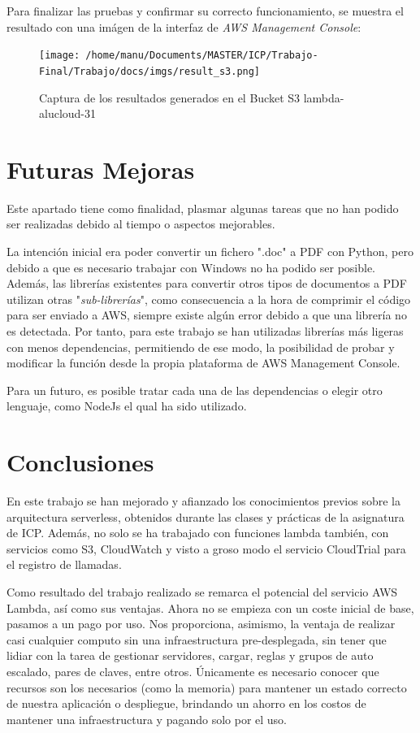 \documentclass[
]{article}
\begin{document}
Para finalizar las pruebas y confirmar su correcto funcionamiento, se
muestra el resultado con una imágen de la interfaz de \textit{AWS Management
Console}:

\begin{figure}[H]
\centering
\texttt{[image: /home/manu/Documents/MASTER/ICP/Trabajo-Final/Trabajo/docs/imgs/result\_s3.png]}
\caption{Captura de los resultados generados en el Bucket S3 lambda-alucloud-31}
\end{figure}
\newpage
\hypertarget{header-n206}{%
\section{Futuras Mejoras}\label{header-n206}}

Este apartado tiene como finalidad, plasmar algunas tareas que no han
podido ser realizadas debido al tiempo o aspectos mejorables.

La intención inicial era poder convertir un fichero ".doc" a PDF con
Python, pero debido a que es necesario trabajar con Windows no ha podido
ser posible. Además, las librerías existentes para convertir otros tipos
de documentos a PDF utilizan otras "\emph{sub-librerías}", como
consecuencia a la hora de comprimir el código para ser enviado a AWS,
siempre existe algún error debido a que una librería no es detectada.
Por tanto, para este trabajo se han utilizadas librerías más ligeras
con menos dependencias, permitiendo de ese modo, la posibilidad de
probar y modificar la función desde la propia plataforma de AWS
Management Console.

Para un futuro, es posible tratar cada una de las dependencias o elegir
otro lenguaje, como NodeJs el qual ha sido utilizado.

\hypertarget{header-n210}{%
\section{Conclusiones}\label{header-n210}}
En este trabajo se han mejorado y afianzado los conocimientos previos sobre la arquitectura serverless, obtenidos durante las clases y prácticas de la asignatura de ICP. Además, no solo se ha trabajado con funciones lambda también, con servicios como S3, CloudWatch y visto a groso modo el servicio CloudTrial para el registro de llamadas. 

Como resultado del trabajo realizado se remarca el potencial del servicio AWS Lambda, así como sus ventajas. Ahora no se empieza con un coste inicial de base, pasamos a un pago por uso. Nos proporciona, asimismo, la ventaja de realizar casi cualquier computo sin una infraestructura pre-desplegada, sin tener que lidiar con la tarea de gestionar servidores, cargar, reglas y grupos de auto escalado, pares de claves, entre otros.  Únicamente es necesario conocer que recursos son los necesarios (como la memoria) para mantener un estado correcto de nuestra aplicación o despliegue, brindando un ahorro en los costos de mantener una infraestructura y pagando solo por el uso.  
\end{document}
